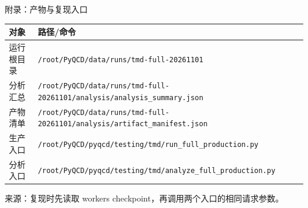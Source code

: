 \documentclass[UTF8,aspectratio=169,11pt]{ctexbeamer}
\newcommand{\source}[1]{\vspace{0.06em}\par{\raggedright\scriptsize\color{muted}来源：#1\par}}
\begin{document}
\begin{frame}[t]{附录：产物与复现入口}
  \small\begin{tabularx}{\linewidth}{@{}l X@{}}\toprule 对象 & 路径/命令 \\ \midrule 运行根目录 & \nolinkurl{/root/PyQCD/data/runs/tmd-full-20261101} \\ 分析汇总 & \nolinkurl{/root/PyQCD/data/runs/tmd-full-20261101/analysis/analysis_summary.json} \\ 产物清单 & \nolinkurl{/root/PyQCD/data/runs/tmd-full-20261101/analysis/artifact_manifest.json} \\ 生产入口 & \nolinkurl{/root/PyQCD/pyqcd/testing/tmd/run_full_production.py} \\ 分析入口 & \nolinkurl{/root/PyQCD/pyqcd/testing/tmd/analyze_full_production.py} \\ \bottomrule\end{tabularx}

  \source{复现时先读取 workers checkpoint，再调用两个入口的相同请求参数。}
\end{frame}
\end{document}
